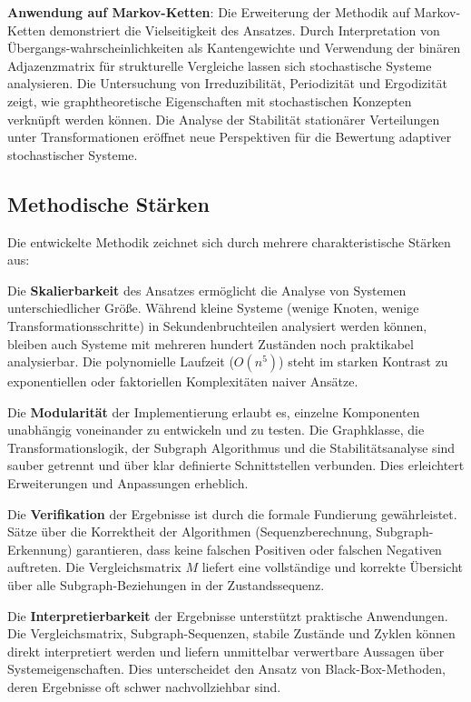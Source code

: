 \documentclass[a4paper,12pt]{article}
\theoremstyle{definition}
\begin{document}
\textbf{Anwendung auf Markov-Ketten}: Die Erweiterung der Methodik auf Markov-Ketten demonstriert die Vielseitigkeit des Ansatzes. Durch Interpretation von Übergangs-wahrscheinlichkeiten als Kantengewichte und Verwendung der binären Adjazenzmatrix für strukturelle Vergleiche lassen sich stochastische Systeme analysieren. Die Untersuchung von Irreduzibilität, Periodizität und Ergodizität zeigt, wie graphtheoretische Eigenschaften mit stochastischen Konzepten verknüpft werden können. Die Analyse der Stabilität stationärer Verteilungen unter Transformationen eröffnet neue Perspektiven für die Bewertung adaptiver stochastischer Systeme.

\subsection{Methodische Stärken}

Die entwickelte Methodik zeichnet sich durch mehrere charakteristische Stärken aus:

Die \textbf{Skalierbarkeit} des Ansatzes ermöglicht die Analyse von Systemen unterschiedlicher Größe. Während kleine Systeme (wenige Knoten, wenige Transformationsschritte) in Sekundenbruchteilen analysiert werden können, bleiben auch Systeme mit mehreren hundert Zuständen noch praktikabel analysierbar. Die polynomielle Laufzeit ($O(n^5)$) steht im starken Kontrast zu exponentiellen oder faktoriellen Komplexitäten naiver Ansätze.

Die \textbf{Modularität} der Implementierung erlaubt es, einzelne Komponenten unabhängig voneinander zu entwickeln und zu testen. Die Graphklasse, die Transformationslogik, der Subgraph Algorithmus und die Stabilitätsanalyse sind sauber getrennt und über klar definierte Schnittstellen verbunden. Dies erleichtert Erweiterungen und Anpassungen erheblich.

Die \textbf{Verifikation} der Ergebnisse ist durch die formale Fundierung gewährleistet. Sätze über die Korrektheit der Algorithmen (Sequenzberechnung, Subgraph-Erkennung) garantieren, dass keine falschen Positiven oder falschen Negativen auftreten. Die Vergleichsmatrix $M$ liefert eine vollständige und korrekte Übersicht über alle Subgraph-Beziehungen in der Zustandssequenz.

Die \textbf{Interpretierbarkeit} der Ergebnisse unterstützt praktische Anwendungen. Die Vergleichsmatrix, Subgraph-Sequenzen, stabile Zustände und Zyklen können direkt interpretiert werden und liefern unmittelbar verwertbare Aussagen über Systemeigenschaften. Dies unterscheidet den Ansatz von Black-Box-Methoden, deren Ergebnisse oft schwer nachvollziehbar sind.
\end{document}
